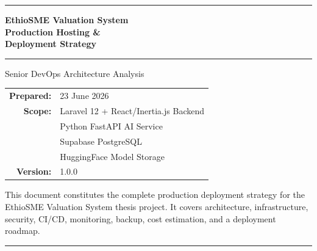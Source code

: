\documentclass[12pt,a4paper]{report}
\begin{document}
\begin{titlepage}
    \centering
    \vspace*{2cm}

    {\color{primaryblue}\rule{\linewidth}{2pt}}
    \vspace{0.5cm}

    {\Huge\bfseries\color{primaryblue}
        EthioSME Valuation System\\[0.4em]
        Production Hosting \&\\[0.2em]
        Deployment Strategy
    }

    \vspace{0.5cm}
    {\color{primaryblue}\rule{\linewidth}{2pt}}

    \vspace{1.5cm}

    {\large\color{darkgray}Senior DevOps Architecture Analysis}

    \vspace{0.8cm}

    \begin{tabular}{rl}
        \textbf{Prepared:}  & 23 June 2026 \\[4pt]
        \textbf{Scope:}     & Laravel 12 + React/Inertia.js Backend \\[2pt]
                            & Python FastAPI AI Service \\[2pt]
                            & Supabase PostgreSQL \\[2pt]
                            & HuggingFace Model Storage \\[4pt]
        \textbf{Version:}   & 1.0.0 \\
    \end{tabular}

    \vfill

    {\small\color{darkgray}
        This document constitutes the complete production deployment
        strategy for the EthioSME Valuation System thesis project.
        It covers architecture, infrastructure, security, CI/CD,
        monitoring, backup, cost estimation, and a deployment roadmap.
    }

    \vspace{1cm}
    {\color{primaryblue}\rule{\linewidth}{1pt}}
\end{titlepage}

\tableofcontents
\newpage

\end{document}
